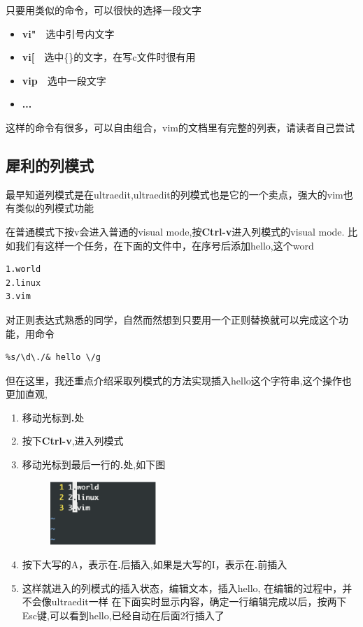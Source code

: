 \documentclass[adobefonts]{ctexart}
\begin{document}
只要用类似的命令，可以很快的选择一段文字
\begin{itemize}
\item  \textbf{vi"}~~选中引号内文字
\item  \textbf{vi[}~~选中\{\}的文字，在写c文件时很有用
\item  \textbf{vip}~~选中一段文字
\item  \textbf{...}
\end{itemize}
这样的命令有很多，可以自由组合，vim的文档里有完整的列表，请读者自己尝试
\subsection{犀利的列模式}
最早知道列模式是在ultraedit,ultraedit的列模式也是它的一个卖点，强大的vim也有类似的列模式功能

在普通模式下按v会进入普通的visual mode,按\textbf{Ctrl-v}进入列模式的visual mode.
比如我们有这样一个任务，在下面的文件中，在序号后添加hello,这个word
\begin{verbatim}
1.world
2.linux
3.vim
\end{verbatim}
对正则表达式熟悉的同学，自然而然想到只要用一个正则替换就可以完成这个功能，用命令
\begin{verbatim}
%s/\d\./& hello \/g 
\end{verbatim}
但在这里，我还重点介绍采取列模式的方法实现插入hello这个字符串,这个操作也更加直观,
\begin{enumerate}
	\item 移动光标到\textbf{.}处
	\item 按下\textbf{Ctrl-v},进入列模式
	\item 移动光标到最后一行的\textbf{.}处,如下图
\begin{figure}[htbp]
\includegraphics[width=4cm]{col-visual-highlight.eps}
\end{figure}
	\item 按下大写的A，表示在\textbf{.}后插入,如果是大写的I，表示在\textbf{.}前插入
	\item 这样就进入的列模式的插入状态，编辑文本，插入hello, 在编辑的过程中，并不会像ultraedit一样
          在下面实时显示内容，确定一行编辑完成以后，按两下Esc键,可以看到hello,已经自动在后面2行插入了
\end{enumerate}
\end{document}
